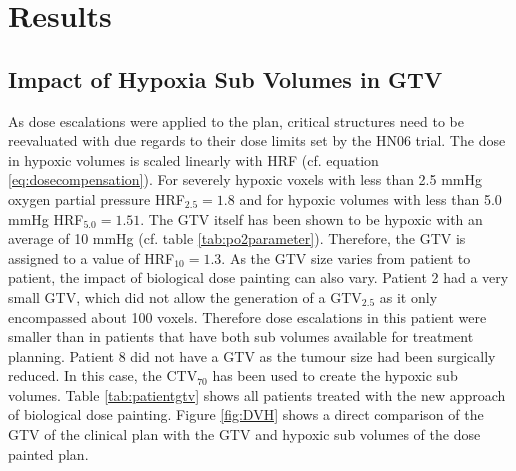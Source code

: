 \section{Results}
\subsection{Impact of Hypoxia Sub Volumes in GTV}
As dose escalations were applied to the plan, critical structures need to be reevaluated with due regards to their dose limits set by the HN06 trial. The dose in hypoxic volumes is scaled linearly with HRF (cf. equation \ref{eq:dosecompensation}). For severely hypoxic voxels with less than 2.5 mmHg oxygen partial pressure HRF$_{2.5}=1.8$ and for hypoxic volumes with less than 5.0 mmHg HRF$_{5.0}=1.51$. The GTV itself has been shown to be hypoxic with an average of 10 mmHg (cf. table \ref{tab:po2parameter}). Therefore, the GTV is assigned to a value of HRF$_\mathrm{10}=1.3$. As the GTV size varies from patient to patient, the impact of biological dose painting can also vary. Patient 2 had a very small GTV, which did not allow the generation of a GTV$_{2.5}$ as it only encompassed about 100 voxels. Therefore dose escalations in this patient were smaller than in patients that have both sub volumes available for treatment planning. Patient 8 did not have a GTV as the tumour size had been surgically reduced. In this case, the CTV$_{70}$ has been used to create the hypoxic sub volumes. Table \ref{tab:patientgtv} shows all patients treated with the new approach of biological dose painting. Figure \ref{fig:DVH} shows a direct comparison of the GTV of the clinical plan with the GTV and hypoxic sub volumes of the dose painted plan. 
\begin{sidewaysfigure}[p]
\centering
{}
\caption{Dose volume histograms for the GTV of the clinical plan (green) and all volumes from biological dose painting: GTV (red), GTV$_{5.0}$ (blue), GTV$_{2.5}$ (magenta). Patient 2 did not have a GTV$_{2.5}$ as the GTV was to small. Complete delivery is not possible to the GTV and hypoxic sub volumes. Desired dose values are $D_{2.5} = 126$ Gy for the 2.5 mmHg sub volume, $D_{5.0} = 105.7$ Gy for the 5.0 mmHg sub volume and $D_\mathrm{GTV} = 91$ Gy for the GTV which was assigned with 10 mmHg.}
\label{fig:DVH}
\end{sidewaysfigure}
